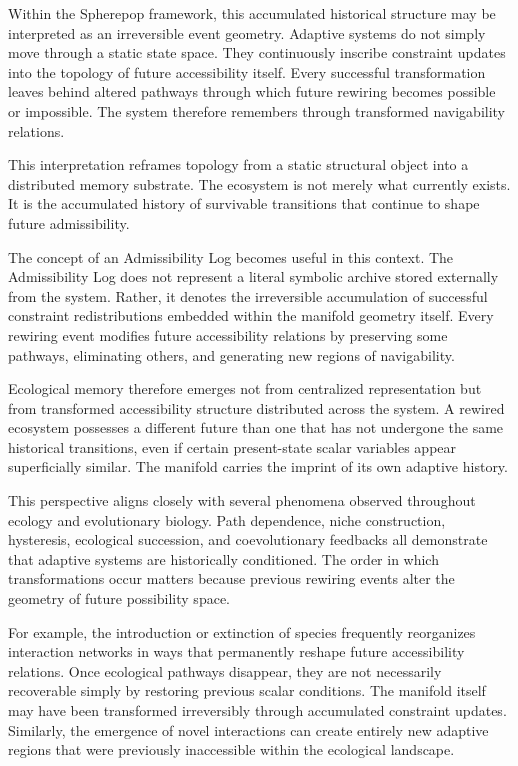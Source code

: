 \documentclass[11pt,a4paper]{article}
\begin{document}
Within the Spherepop framework, this accumulated historical structure may be interpreted as an irreversible event geometry. Adaptive systems do not simply move through a static state space. They continuously inscribe constraint updates into the topology of future accessibility itself. Every successful transformation leaves behind altered pathways through which future rewiring becomes possible or impossible. The system therefore remembers through transformed navigability relations.

This interpretation reframes topology from a static structural object into a distributed memory substrate. The ecosystem is not merely what currently exists. It is the accumulated history of survivable transitions that continue to shape future admissibility.

The concept of an Admissibility Log becomes useful in this context. The Admissibility Log does not represent a literal symbolic archive stored externally from the system. Rather, it denotes the irreversible accumulation of successful constraint redistributions embedded within the manifold geometry itself. Every rewiring event modifies future accessibility relations by preserving some pathways, eliminating others, and generating new regions of navigability.

Ecological memory therefore emerges not from centralized representation but from transformed accessibility structure distributed across the system. A rewired ecosystem possesses a different future than one that has not undergone the same historical transitions, even if certain present-state scalar variables appear superficially similar. The manifold carries the imprint of its own adaptive history.

This perspective aligns closely with several phenomena observed throughout ecology and evolutionary biology. Path dependence, niche construction, hysteresis, ecological succession, and coevolutionary feedbacks all demonstrate that adaptive systems are historically conditioned. The order in which transformations occur matters because previous rewiring events alter the geometry of future possibility space.

For example, the introduction or extinction of species frequently reorganizes interaction networks in ways that permanently reshape future accessibility relations. Once ecological pathways disappear, they are not necessarily recoverable simply by restoring previous scalar conditions. The manifold itself may have been transformed irreversibly through accumulated constraint updates. Similarly, the emergence of novel interactions can create entirely new adaptive regions that were previously inaccessible within the ecological landscape.
\end{document}
